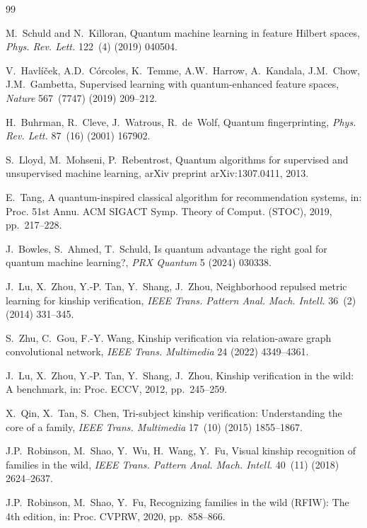 \documentclass[preprint,12pt]{elsarticle}
\begin{document}
\begin{thebibliography}{99}

M.~Schuld and N.~Killoran, Quantum machine learning in feature Hilbert
spaces, \emph{Phys. Rev. Lett.} 122~(4) (2019) 040504.

V.~Havl{\'i}{\v{c}}ek, A.D.~C{\'o}rcoles, K.~Temme, A.W.~Harrow,
A.~Kandala, J.M.~Chow, J.M.~Gambetta, Supervised learning with
quantum-enhanced feature spaces, \emph{Nature} 567~(7747) (2019) 209--212.

H.~Buhrman, R.~Cleve, J.~Watrous, R.~de~Wolf, Quantum fingerprinting,
\emph{Phys. Rev. Lett.} 87~(16) (2001) 167902.

S.~Lloyd, M.~Mohseni, P.~Rebentrost, Quantum algorithms for supervised and
unsupervised machine learning, arXiv preprint arXiv:1307.0411, 2013.

E.~Tang, A quantum-inspired classical algorithm for recommendation systems,
in: Proc. 51st Annu. ACM SIGACT Symp. Theory of Comput. (STOC), 2019,
pp.~217--228.

J.~Bowles, S.~Ahmed, T.~Schuld, Is quantum advantage the right goal for
quantum machine learning?, \emph{PRX Quantum} 5 (2024) 030338.

J.~Lu, X.~Zhou, Y.-P. Tan, Y.~Shang, J.~Zhou, Neighborhood repulsed metric
learning for kinship verification, \emph{IEEE Trans. Pattern Anal. Mach.
Intell.} 36~(2) (2014) 331--345.

S.~Zhu, C.~Gou, F.-Y. Wang, Kinship verification via relation-aware graph
convolutional network, \emph{IEEE Trans. Multimedia} 24 (2022) 4349--4361.

J.~Lu, X.~Zhou, Y.-P. Tan, Y.~Shang, J.~Zhou, Kinship verification in the
wild: A benchmark, in: Proc. ECCV, 2012, pp.~245--259.

X.~Qin, X.~Tan, S.~Chen, Tri-subject kinship verification: Understanding the
core of a family, \emph{IEEE Trans. Multimedia} 17~(10) (2015) 1855--1867.

J.P.~Robinson, M.~Shao, Y.~Wu, H.~Wang, Y.~Fu, Visual kinship recognition
of families in the wild, \emph{IEEE Trans. Pattern Anal. Mach. Intell.}
40~(11) (2018) 2624--2637.

J.P.~Robinson, M.~Shao, Y.~Fu, Recognizing families in the wild (RFIW): The
4th edition, in: Proc. CVPRW, 2020, pp.~858--866.


\end{thebibliography}
\end{document}
